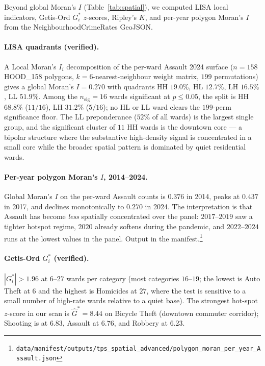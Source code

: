 \documentclass[article,shortnames,nojss]{jss}
\begin{document}
Beyond global Moran's $I$ (Table~\ref{tab:spatial}), we computed
LISA local indicators, Getis-Ord $G^\ast_i$ $z$-scores, Ripley's
$K$, and per-year polygon Moran's $I$ from the
NeighbourhoodCrimeRates GeoJSON.

\paragraph{LISA quadrants (verified).}  A Local Moran's $I_i$
decomposition of the per-ward Assault 2024 surface ($n=158$
HOOD\_158 polygons, $k=6$-nearest-neighbour weight matrix,
$199$ permutations) gives a global Moran's $I = 0.270$ with
quadrants HH $19.0\%$, HL $12.7\%$, LH $16.5\%$, LL $51.9\%$.
Among the $n_{\text{sig}}=16$ wards significant at $p\le 0.05$,
the split is HH $68.8\%$ ($11/16$), LH $31.2\%$ ($5/16$); no
HL or LL ward clears the $199$-perm significance floor.  The
LL preponderance ($52\%$ of all wards) is the largest single
group, and the significant cluster of $11$ HH wards is the
downtown core --- a bipolar structure
where the substantive high-density signal is concentrated in a
small core while the broader spatial pattern is dominated by
quiet residential wards.

\paragraph{Per-year polygon Moran's $I$, 2014--2024.}  Global
Moran's $I$ on the per-ward Assault counts is $0.376$ in
2014, peaks at $0.437$ in 2017, and declines monotonically to
$0.270$ in 2024.  The interpretation is that Assault has
become \emph{less} spatially concentrated over the panel:
$2017$--$2019$ saw a tighter hotspot regime, $2020$ already
softens during the pandemic, and $2022$--$2024$ runs at the
lowest values in the panel.  Output in the
manifest.\footnote{\texttt{data/manifest/outputs/tps\_spatial\_advanced/polygon\_moran\_per\_year\_Assault.json}}

\paragraph{Getis-Ord $G^\ast_i$ (verified).}  $|G^\ast_i|>1.96$
at $6$--$27$ wards per category (most categories $16$--$19$;
the lowest is Auto Theft at $6$ and the highest is Homicides at
$27$, where the test is sensitive to a small number of high-rate
wards relative to a quiet base).  The strongest hot-spot
$z$-score in our scan is $\hat G^\ast = 8.44$ on Bicycle Theft
(downtown commuter corridor); Shooting is at $6.83$, Assault at
$6.76$, and Robbery at $6.23$.
\end{document}
